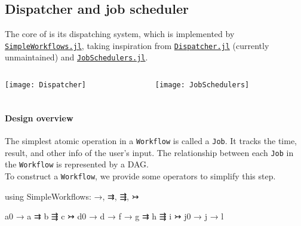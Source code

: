 \subsection{Dispatcher and job scheduler}

\begin{frame}{\subsecname}
    The core of \express{} is its dispatching system,
    which is implemented by
    \href{https://github.com/MineralsCloud/SimpleWorkflows.jl}{\texttt{SimpleWorkflows.jl}},
    taking inspiration from
    \href{https://github.com/invenia/Dispatcher.jl}{\texttt{Dispatcher.jl}}
    (currently unmaintained) and
    \href{https://github.com/cihga39871/JobSchedulers.jl}{\texttt{JobSchedulers.jl}}.

    \begin{columns}[t]
        \begin{column}{0.4\textwidth}
            \begin{center}
                \texttt{[image: Dispatcher]}
            \end{center}
        \end{column}
        \hfill
        \begin{column}{0.4\textwidth}
            \begin{center}
                \texttt{[image: JobSchedulers]}
            \end{center}
        \end{column}
    \end{columns}
\end{frame}

\begin{frame}[fragile]
    \frametitle{\subsecname}
    \framesubtitle{Design overview}

    The simplest atomic operation in a \texttt{Workflow} is called a \texttt{Job}.
    It tracks the time, result, and other info of the user's input.
    The relationship between each \texttt{Job} in the \texttt{Workflow} is represented by a
    DAG.\\

    To construct a \texttt{Workflow}, we provide some operators to simplify this step.

        {\footnotesize
            \begin{algorithmblock}
                \begin{juliaverbatim}
using SimpleWorkflows: →, ⇉, ⇶, ↣

a0 → a ⇉ b ⇶ c ↣ d0 → d → f → g ⇉ h ⇶ i ↣ j0 → j → l
        \end{juliaverbatim}
            \end{algorithmblock}
        }
\end{frame}

